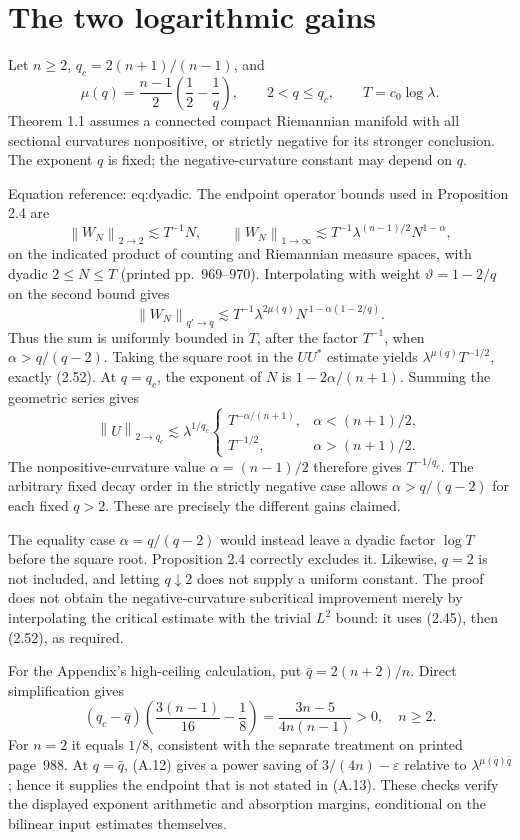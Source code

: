 \documentclass[10pt]{article}
\begin{document}
\section*{The two logarithmic gains}
Let \(n\ge2\), \(q_c=2(n+1)/(n-1)\), and \[\mu(q)=\frac{n-1}{2}\left(\frac12-\frac1q\right),
 \qquad 2<q\le q_c,\qquad T=c_0\log\lambda.\] Theorem 1.1 assumes a connected compact Riemannian manifold with all sectional curvatures nonpositive, or strictly negative for its stronger conclusion. The exponent \(q\) is fixed; the negative-curvature constant may depend on \(q\).\par
Equation reference: eq:dyadic. The endpoint operator bounds used in Proposition 2.4 are \[\left\lVert W_N\right\rVert_{2\to2}\lesssim T^{-1}N,\qquad
 \left\lVert W_N\right\rVert_{1\to\infty}\lesssim
 T^{-1}\lambda^{(n-1)/2}N^{1-\alpha},\] on the indicated product of counting and Riemannian measure spaces, with dyadic \(2\le N\le T\) (printed pp. 969–970). Interpolating with weight \(\vartheta=1-2/q\) on the second bound gives \[
 \left\lVert W_N\right\rVert_{q'\to q}
 \lesssim T^{-1}\lambda^{2\mu(q)}
 N^{\,1-\alpha(1-2/q)}.\] Thus the sum is uniformly bounded in \(T\), after the factor \(T^{-1}\), when \(\alpha>q/(q-2)\). Taking the square root in the \(UU^*\) estimate yields \(\lambda^{\mu(q)}T^{-1/2}\), exactly (2.52). At \(q=q_c\), the exponent of \(N\) is \(1-2\alpha/(n+1)\). Summing the geometric series gives \[\left\lVert U\right\rVert_{2\to q_c}\lesssim\lambda^{1/q_c}
 \begin{cases}
 T^{-\alpha/(n+1)},&\alpha<(n+1)/2,\\
 T^{-1/2},&\alpha>(n+1)/2.
 \end{cases}\] The nonpositive-curvature value \(\alpha=(n-1)/2\) therefore gives \(T^{-1/q_c}\). The arbitrary fixed decay order in the strictly negative case allows \(\alpha>q/(q-2)\) for each fixed \(q>2\). These are precisely the different gains claimed.\par
The equality case \(\alpha=q/(q-2)\) would instead leave a dyadic factor \(\log T\) before the square root. Proposition 2.4 correctly excludes it. Likewise, \(q=2\) is not included, and letting \(q\downarrow2\) does not supply a uniform constant. The proof does not obtain the negative-curvature subcritical improvement merely by interpolating the critical estimate with the trivial \(L^2\) bound: it uses (2.45), then (2.52), as required.\par
For the Appendix’s high-ceiling calculation, put \(\bar q=2(n+2)/n\). Direct simplification gives \[(q_c-\bar q)\left(\frac{3(n-1)}{16}-\frac18\right)
 =\frac{3n-5}{4n(n-1)}>0,\quad n\ge2.\] For \(n=2\) it equals \(1/8\), consistent with the separate treatment on printed page 988. At \(q=\bar q\), (A.12) gives a power saving of \(3/(4n)-\varepsilon\) relative to \(\lambda^{\mu(\bar q)\bar q}\); hence it supplies the endpoint that is not stated in (A.13). These checks verify the displayed exponent arithmetic and absorption margins, conditional on the bilinear input estimates themselves.\par
\end{document}
